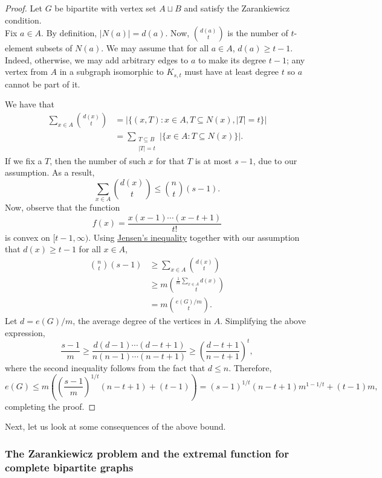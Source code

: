 \documentclass{article}
\begin{document}
		\begin{proof}
			Let $G$ be bipartite with vertex set $A \sqcup B$ and satisfy the Zarankiewicz condition.\\
			Fix $a \in A$. By definition, $|N(a)| = d(a)$. Now, $\binom{d(a)}{t}$ is the number of $t$-element subsets of $N(a)$. We may assume that for all $a \in A$, $d(a) \ge t-1$. Indeed, otherwise, we may add arbitrary edges to $a$ to make its degree $t-1$; any vertex from $A$ in a subgraph isomorphic to $K_{s,t}$ must have at least degree $t$ so $a$ cannot be part of it.

			We have that
			\begin{align*}
				\sum_{x \in A} \binom{d(x)}{t} &= \left| \{ (x,T) : x \in A, T \subseteq N(x), |T|=t \} \right| \\
				&= \sum_{\substack{T \subseteq B \\ |T| = t}} |\{x \in A : T \subseteq N(x)\}|.
			\end{align*}
			If we fix a $T$, then the number of such $x$ for that $T$ is at most $s-1$, due to our assumption. As a result,
			\[ \sum_{x \in A} \binom{d(x)}{t} \le \binom{n}{t} (s-1). \]
			Now, observe that the function
			\[ f(x) = \frac{x(x-1)\cdots(x-t+1)}{t!} \]
			is convex on $[t-1,\infty)$.
			Using \href{https://en.wikipedia.org/wiki/Jensen%27s_inequality#Finite_form}{Jensen's inequality} together with our assumption that $d(x) \ge t-1$ for all $x\in A$,
			\begin{align}
				\binom{n}{t} (s-1) &\ge \sum_{x\in A} \binom{d(x)}{t} \nonumber \\
				 &\ge m \binom{\frac{1}{m}\sum_{x\in A} d(x)}{t} \nonumber
				  \\
				 &= m \binom{e(G)/m}{t}. \label{eqn: kovari sos turan intermediate step}
			\end{align}
			Let $d = e(G)/m$, the average degree of the vertices in $A$. Simplifying the above expression,
			\[ \frac{s-1}{m} \ge \frac{d(d-1)\cdots (d-t+1)}{n(n-1)\cdots(n-t+1)} \ge \left(\frac{d-t+1}{n-t+1}\right)^t, \]
			where the second inequality follows from the fact that $d \le n$. Therefore,
			\[ e(G) \le m \left( \left(\frac{s-1}{m}\right)^{1/t} (n-t+1) + (t-1) \right) = (s-1)^{1/t} (n-t+1) m^{1 - 1/t} + (t-1)m, \]
			completing the proof.
		\end{proof}

		Next, let us look at some consequences of the above bound.

		\subsubsection{The Zarankiewicz problem and the extremal function for complete bipartite graphs}
\end{document}
